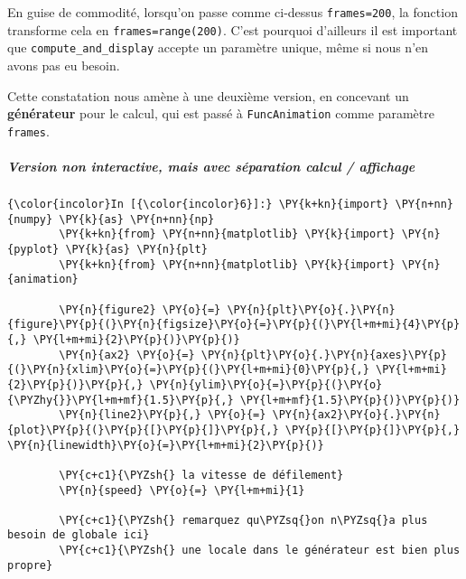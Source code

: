 En guise de commodité, lorsqu'on passe comme ci-dessus
\texttt{frames=200}, la fonction transforme cela en
\texttt{frames=range(200)}. C'est pourquoi d'ailleurs il est important
que \texttt{compute\_and\_display} accepte un paramètre unique, même si
nous n'en avons pas eu besoin.

    Cette constatation nous amène à une deuxième version, en concevant un
\textbf{générateur} pour le calcul, qui est passé à
\texttt{FuncAnimation} comme paramètre \texttt{frames}.

    \hypertarget{version-non-interactive-mais-avec-suxe9paration-calcul-affichage}{%
\subparagraph{Version non interactive, mais avec séparation calcul /
affichage}\label{version-non-interactive-mais-avec-suxe9paration-calcul-affichage}}

    \begin{Verbatim}[commandchars=\\\{\}]
{\color{incolor}In [{\color{incolor}6}]:} \PY{k+kn}{import} \PY{n+nn}{numpy} \PY{k}{as} \PY{n+nn}{np}
        \PY{k+kn}{from} \PY{n+nn}{matplotlib} \PY{k}{import} \PY{n}{pyplot} \PY{k}{as} \PY{n}{plt}
        \PY{k+kn}{from} \PY{n+nn}{matplotlib} \PY{k}{import} \PY{n}{animation}
        
        \PY{n}{figure2} \PY{o}{=} \PY{n}{plt}\PY{o}{.}\PY{n}{figure}\PY{p}{(}\PY{n}{figsize}\PY{o}{=}\PY{p}{(}\PY{l+m+mi}{4}\PY{p}{,} \PY{l+m+mi}{2}\PY{p}{)}\PY{p}{)}
        \PY{n}{ax2} \PY{o}{=} \PY{n}{plt}\PY{o}{.}\PY{n}{axes}\PY{p}{(}\PY{n}{xlim}\PY{o}{=}\PY{p}{(}\PY{l+m+mi}{0}\PY{p}{,} \PY{l+m+mi}{2}\PY{p}{)}\PY{p}{,} \PY{n}{ylim}\PY{o}{=}\PY{p}{(}\PY{o}{\PYZhy{}}\PY{l+m+mf}{1.5}\PY{p}{,} \PY{l+m+mf}{1.5}\PY{p}{)}\PY{p}{)}
        \PY{n}{line2}\PY{p}{,} \PY{o}{=} \PY{n}{ax2}\PY{o}{.}\PY{n}{plot}\PY{p}{(}\PY{p}{[}\PY{p}{]}\PY{p}{,} \PY{p}{[}\PY{p}{]}\PY{p}{,} \PY{n}{linewidth}\PY{o}{=}\PY{l+m+mi}{2}\PY{p}{)}
        
        \PY{c+c1}{\PYZsh{} la vitesse de défilement}
        \PY{n}{speed} \PY{o}{=} \PY{l+m+mi}{1}
        
        \PY{c+c1}{\PYZsh{} remarquez qu\PYZsq{}on n\PYZsq{}a plus besoin de globale ici}
        \PY{c+c1}{\PYZsh{} une locale dans le générateur est bien plus propre}
        

\end{Verbatim}
